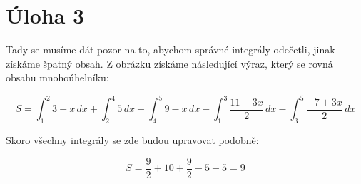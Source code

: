 \documentclass{fkssolpub}
\begin{document}
\section{Úloha 3}

Tady se musíme dát pozor na to, abychom správné integrály odečetli, jinak
získáme špatný obsah. Z obrázku získáme následující výraz, který se 
rovná obsahu mnohoúhelníku:

\[
  S = \int_1^2 3 + x \, dx + \int_2^4 5 \, dx + \int_4^5 9 - x \, dx
    - \int_1^3 \frac{11 - 3x}{2} \, dx - \int_3^5 \frac{-7 + 3x}{2} \, dx
\]

Skoro všechny integrály se zde budou upravovat podobně:

\[
  S = \frac{9}{2} + 10 + \frac{9}{2} - 5 - 5 = 9
\]
\end{document}

